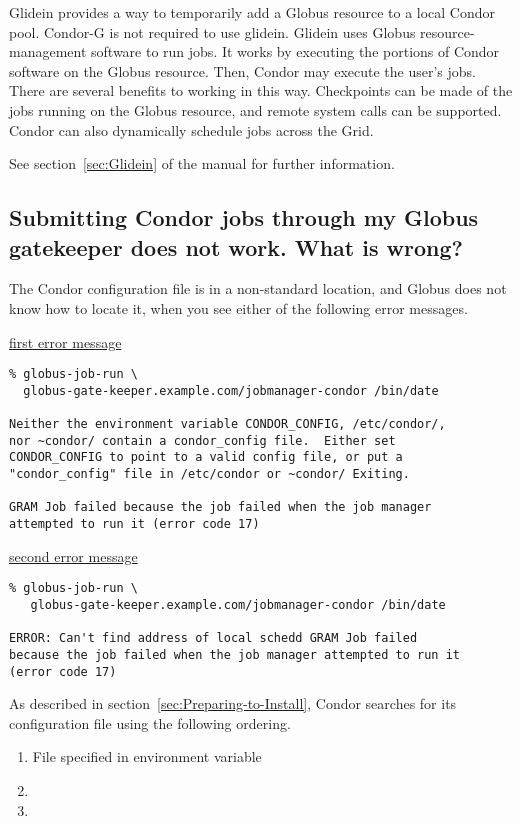 Glidein provides a way to temporarily add a Globus resource
to a local Condor pool.
Condor-G is not required to use glidein.
Glidein uses Globus resource-management software to run jobs.
It works by executing the portions of Condor
software on the Globus resource.
Then, Condor may execute the user's jobs.
There are several benefits to working in this way.
Checkpoints can be made of the jobs running on the Globus resource,
and remote system calls can be supported.
Condor can also dynamically schedule jobs across the Grid.

See section~\ref{sec:Glidein} of the manual
for further information.


\subsection*{Submitting Condor jobs through my Globus gatekeeper does not work.  What is wrong?}

The Condor configuration file is in a non-standard location,
and Globus does not know how to locate it, when you see either of the
following error messages.

\underline{first error message}
\footnotesize
\begin{verbatim}
% globus-job-run \
  globus-gate-keeper.example.com/jobmanager-condor /bin/date

Neither the environment variable CONDOR_CONFIG, /etc/condor/,
nor ~condor/ contain a condor_config file.  Either set
CONDOR_CONFIG to point to a valid config file, or put a
"condor_config" file in /etc/condor or ~condor/ Exiting.

GRAM Job failed because the job failed when the job manager
attempted to run it (error code 17)
\end{verbatim}
\normalsize

\underline{second error message}
\footnotesize
\begin{verbatim}
% globus-job-run \
   globus-gate-keeper.example.com/jobmanager-condor /bin/date

ERROR: Can't find address of local schedd GRAM Job failed
because the job failed when the job manager attempted to run it
(error code 17)
\end{verbatim}
\normalsize

As described in
section~\ref{sec:Preparing-to-Install}, 
Condor searches for its configuration file using the following
ordering.
\begin{enumerate}
\item File specified in  environment variable
\item {}
\item {}
\end{enumerate}

